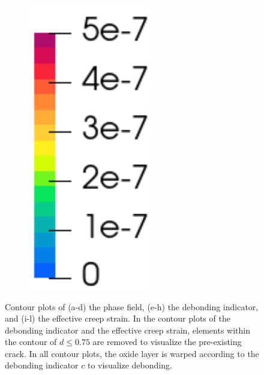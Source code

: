 \begin{figure}[!htb]
\begin{subfigure}[b]{0.1\textwidth}
    \includegraphics[width=0.6\textwidth]{Chapter5/figures/spallation/colorbar_ep_seed}
    \vspace{4em}
  \end{subfigure}
  \caption[Simulation of spallation with a pre-existing crack under normal operating conditions.]{Contour plots of (a-d) the phase field, (e-h) the debonding indicator, and (i-l) the effective creep strain. In the contour plots of the debonding indicator and the effective creep strain, elements within the contour of $d \leqslant 0.75$ are removed to visualize the pre-existing crack. In all contour plots, the oxide layer is warped according to the debonding indicator $c$ to visualize debonding. }
  \label{fig: Chapter5/spallation/animation_seed}
\end{figure}

